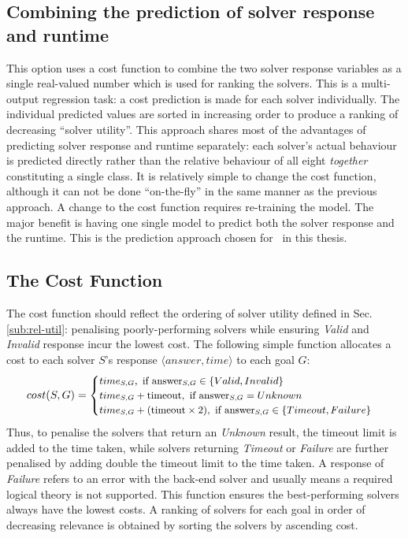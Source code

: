 \subsection{Combining the prediction of solver response and runtime}
This option uses a cost function to combine the two solver response variables as a single real-valued number which is used for ranking the solvers.
This is a multi-output regression task: a cost prediction is made for each solver individually.
The individual predicted values are sorted in increasing order to produce a ranking of decreasing ``solver utility''.
This approach shares most of the advantages of predicting solver response and runtime separately: each solver's actual behaviour is predicted directly rather than the relative behaviour of all eight \textit{together} constituting a single class. 
It is relatively simple to change the cost function, although it can not be done ``on-the-fly'' in the same manner as the previous approach.
A change to the cost function requires re-training the model.
The major benefit is having one single model to predict both the solver response and the runtime. 
This is the prediction approach chosen for \where~in this thesis.  

\subsection{The Cost Function}
\label{sub:scoring}

The cost function should reflect the ordering of solver utility defined in Sec. \ref{sub:rel-util}: penalising poorly-performing solvers while ensuring \textit{Valid} and \textit{Invalid} response incur the lowest cost.
The following simple function allocates a cost to each solver $S$'s response $\langle answer, time\rangle$ to each goal $G$:
\[\small
cost(S,G) = 
\begin{cases}
time_{S,G}, \text{ if answer}_{S,G} \in \lbrace Valid, Invalid \rbrace \\
time_{S,G} + \text{timeout}, \text{ if answer}_{S,G} = Unknown \\
time_{S,G} + (\text{timeout} \times 2), \text{ if answer}_{S,G} \in \lbrace Timeout, Failure \rbrace
\end{cases}
\]
Thus, to penalise the solvers that return an \textit{Unknown} result, the timeout limit is added to the time taken, while solvers returning \textit{Timeout} or \textit{Failure} are further penalised by 
adding double the timeout limit to the time taken.
A response of \textit{Failure} refers to an error with the back-end solver and usually means a required logical theory is not supported. 
This function ensures the best-performing solvers always have the lowest costs. A ranking of solvers for each goal in order of decreasing relevance is obtained by sorting the solvers by ascending cost.\\ 
\\


